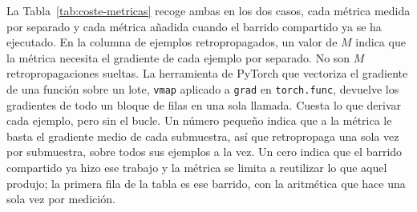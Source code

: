 La Tabla~\ref{tab:coste-metricas} recoge ambas en los dos casos, cada métrica medida por separado y cada métrica añadida cuando el barrido compartido ya se ha ejecutado. En la columna de ejemplos retropropagados, un valor de $M$ indica que la métrica necesita el gradiente de cada ejemplo por separado. No son $M$ retropropagaciones sueltas. La herramienta de PyTorch que vectoriza el gradiente de una función sobre un lote, \texttt{vmap} aplicado a \texttt{grad} en \texttt{torch.func}, devuelve los gradientes de todo un bloque de filas en una sola llamada. Cuesta lo que derivar cada ejemplo, pero sin el bucle. Un número pequeño indica que a la métrica le basta el gradiente medio de cada submuestra, así que retropropaga una sola vez por submuestra, sobre todos sus ejemplos a la vez. Un cero indica que el barrido compartido ya hizo ese trabajo y la métrica se limita a reutilizar lo que aquel produjo; la primera fila de la tabla es ese barrido, con la aritmética que hace una sola vez por medición.

